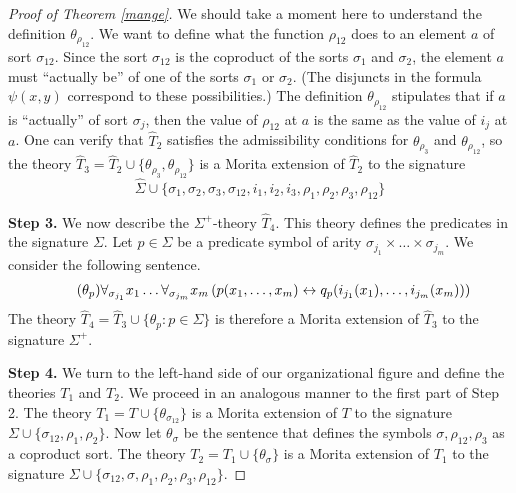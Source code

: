 \begin{proof}[Proof of Theorem \ref{mange}]
We should take a moment here to understand the definition $\theta_{\rho_{12}}$. We want to define what the function $\rho_{12}$ does to an element $a$ of sort $\sigma_{12}$. Since the sort $\sigma_{12}$ is the coproduct of the sorts $\sigma_1$ and $\sigma_2$, the element $a$ must ``actually be'' of one of the sorts $\sigma_1$ or $\sigma_2$. (The disjuncts in the formula $\psi(x,y)$ correspond to these possibilities.) The definition $\theta_{\rho_{12}}$ stipulates that if $a$ is ``actually'' of sort $\sigma_j$, then the value of $\rho_{12}$ at $a$ is the same as the value of $i_j$ at $a$. One can verify that $\widehat{T}_{2}$ satisfies the admissibility conditions for $\theta_{\rho_3}$ and $\theta_{\rho_{12}}$, so the theory $\widehat{T}_3=\widehat{T}_{2}\cup\{\theta_{\rho_3}, \theta_{\rho_{12}}\}$ is a Morita extension of $\widehat{T}_{2}$ to the signature
$$
\widehat{\Sigma}\cup\{\sigma_1,\sigma_2, \sigma_3, \sigma_{12}, i_1,i_2, i_3, \rho_1, \rho_2,\rho_3, \rho_{12}\}
$$

\textbf{Step 3.} We now describe the $\Sigma^+$-theory $\widehat{T}_{4}$. This theory defines the predicates in the signature $\Sigma$. Let $p\in\Sigma$ be a predicate symbol of arity $\sigma_{j_1}\times\ldots\times\sigma_{j_m}$. We consider the following sentence.
\begin{align*}
\tag{$\theta_{p}$}
\forall_{\sigma_{j_1}} x_1\ldots \forall_{\sigma_{j_m}} x_m\left(p(x_1,\ldots, x_m)\leftrightarrow q_{p}(i_{j_1}(x_1),\ldots, i_{j_m}(x_m))\right)
\end{align*}
The theory $\widehat{T}_{4}=\widehat{T}_3\cup\{\theta_{p}:p\in\Sigma\}$ is therefore a Morita extension of $\widehat{T}_3$ to the signature $\Sigma^+$.

\textbf{Step 4.} We turn to the left-hand side of our organizational figure and define the theories $T_1$ and $T_{2}$. We proceed in an analogous manner to the first part of Step 2. The theory $T_1=T\cup\{\theta_{\sigma_{12}}\}$ is a Morita extension of $T$ to the signature $\Sigma\cup\{\sigma_{12}, \rho_1,\rho_2\}$. Now let $\theta_\sigma$ be the sentence that defines the symbols $\sigma, \rho_{12}, \rho_3$ as a coproduct sort. The theory $T_{2}=T_{1}\cup\{\theta_{\sigma}\}$ is a Morita extension of $T_{1}$ to the signature $\Sigma\cup\{\sigma_{12}, \sigma, \rho_1, \rho_2, \rho_3, \rho_{12}\}$.


\end{proof}
